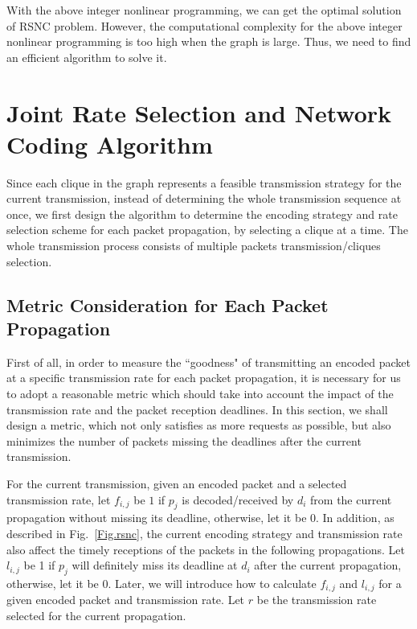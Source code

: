 \documentclass[journal]{IEEEtran}
\begin{document}
With the above integer nonlinear programming, we can get the optimal solution of RSNC problem. However, the computational complexity for the above integer nonlinear programming is too high when the graph is large. Thus, we need to find an efficient algorithm to solve it.

\vspace{-0.04in}
\section{Joint Rate Selection and Network Coding Algorithm}\label{Sec.algorithm}\vspace{-0.03in}
Since each clique in the graph represents a feasible transmission strategy for the current transmission, instead of determining the whole transmission sequence at once, we first design the algorithm to determine the encoding strategy and rate selection scheme for each packet propagation, by selecting a clique at a time. The whole transmission process consists of multiple packets transmission/cliques selection.
\vspace{-0.07in}
\subsection{Metric Consideration for Each Packet Propagation}\vspace{-0.03in}
First of all, in order to measure the ``goodness" of transmitting an encoded packet at a specific transmission rate for each packet propagation, it is necessary for us to adopt a reasonable metric which should take into account the impact of the transmission rate and the packet reception deadlines.
In this section, we shall design a metric, which not only satisfies as more requests as possible, but also minimizes the number of packets missing the deadlines after the current transmission.

For the current transmission, given an encoded packet and a selected transmission rate, let $f_{i,j}$ be $1$ if $p_j$ is decoded/received by $d_i$ from the current propagation without missing its deadline, otherwise, let it be $0$. In addition, as described in Fig.~\ref{Fig.rsnc}, the current encoding strategy and transmission rate also affect the timely receptions of the packets in the following propagations. Let $l_{i,j}$ be 1 if $p_j$ will definitely miss its deadline at $d_i$ after the current propagation, otherwise, let it be $0$. Later, we will introduce how to calculate $f_{i,j}$ and $l_{i,j}$ for a given encoded packet and transmission rate. Let $r$ be the transmission rate selected for the current propagation.
\end{document}
